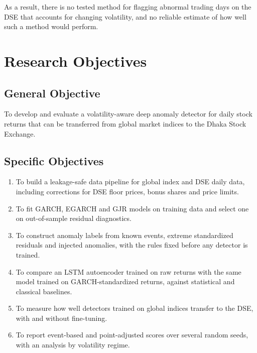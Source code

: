 As a result, there is no tested method for flagging abnormal trading days on the DSE that
accounts for changing volatility, and no reliable estimate of how well such a method would
perform.

\section{Research Objectives}

\subsection*{General Objective}
To develop and evaluate a volatility-aware deep anomaly detector for daily stock returns
that can be transferred from global market indices to the Dhaka Stock Exchange.

\subsection*{Specific Objectives}
\begin{enumerate}
    \item To build a leakage-safe data pipeline for global index and DSE daily data,
    including corrections for DSE floor prices, bonus shares and price limits.
    \item To fit GARCH, EGARCH and GJR models on training data and select one on
    out-of-sample residual diagnostics.
    \item To construct anomaly labels from known events, extreme standardized residuals and
    injected anomalies, with the rules fixed before any detector is trained.
    \item To compare an LSTM autoencoder trained on raw returns with the same model trained
    on GARCH-standardized returns, against statistical and classical baselines.
    \item To measure how well detectors trained on global indices transfer to the DSE, with
    and without fine-tuning.
    \item To report event-based and point-adjusted scores over several random seeds, with an
    analysis by volatility regime.
\end{enumerate}

